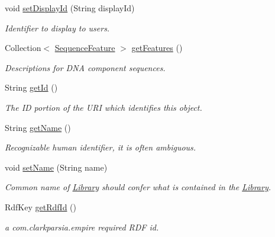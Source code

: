 \begin{DoxyCompactItemize}
void \hyperlink{classorg_1_1sbolstandard_1_1lib_s_b_o_lj_1_1_library_a46b93a70e7bd612a7b429aac4829bc88}{setDisplayId} (String displayId)
\begin{DoxyCompactList}\small\item\em Identifier to display to users. \item\end{DoxyCompactList}\item 
Collection$<$ \hyperlink{classorg_1_1sbolstandard_1_1lib_s_b_o_lj_1_1_sequence_feature}{SequenceFeature} $>$ \hyperlink{classorg_1_1sbolstandard_1_1lib_s_b_o_lj_1_1_library_a6e4112a6cec45766efb5ce852f1e764e}{getFeatures} ()
\begin{DoxyCompactList}\small\item\em Descriptions for DNA component sequences. \item\end{DoxyCompactList}\item 
String \hyperlink{classorg_1_1sbolstandard_1_1lib_s_b_o_lj_1_1_library_aab219518f0eaf3db55b6a62ad6b49407}{getId} ()
\begin{DoxyCompactList}\small\item\em The ID portion of the URI which identifies this object. \item\end{DoxyCompactList}\item 
String \hyperlink{classorg_1_1sbolstandard_1_1lib_s_b_o_lj_1_1_library_a78ee178b6a73658d65ca60da4d1e6683}{getName} ()
\begin{DoxyCompactList}\small\item\em Recognizable human identifier, it is often ambiguous. \item\end{DoxyCompactList}\item 
void \hyperlink{classorg_1_1sbolstandard_1_1lib_s_b_o_lj_1_1_library_ad737b36b74be994e0d8420797ed72f78}{setName} (String name)
\begin{DoxyCompactList}\small\item\em Common name of \hyperlink{classorg_1_1sbolstandard_1_1lib_s_b_o_lj_1_1_library}{Library} should confer what is contained in the \hyperlink{classorg_1_1sbolstandard_1_1lib_s_b_o_lj_1_1_library}{Library}. \item\end{DoxyCompactList}\item 
RdfKey \hyperlink{classorg_1_1sbolstandard_1_1lib_s_b_o_lj_1_1_library_a98d34c30847c78a8922be878a2fa4d49}{getRdfId} ()
\begin{DoxyCompactList}\small\item\em a com.clarkparsia.empire required RDF id. \item\end{DoxyCompactList}\item 

\end{DoxyCompactItemize}
